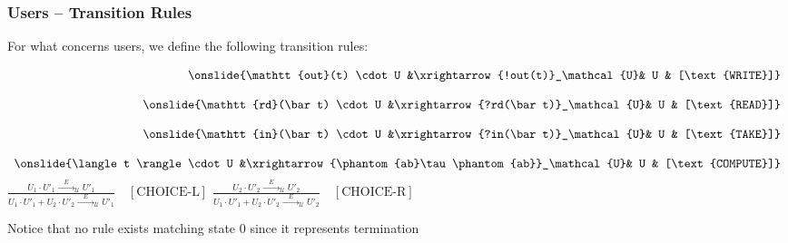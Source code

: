 \documentclass[presentation]{beamer}\mode<presentation>{\usetheme{AMSCesenaPurpleAndGold}}
\begin{document}
\begin{frame}
\frametitle{Users  -- Transition Rules}
    For what concerns \linda{} users, we define the following transition rules:
    
    \[\begin{array}{rclr}
        \onslide{\mathtt{out}(t) \cdot U &\xrightarrow{!out(t)}_\mathcal{U}& U & [\text{WRITE}]} \\
        \\
        \onslide{\mathtt{rd}(\bar t) \cdot U &\xrightarrow{?rd(\bar t)}_\mathcal{U}& U & [\text{READ}]} \\
        \\
        \onslide{\mathtt{in}(\bar t) \cdot U &\xrightarrow{?in(\bar t)}_\mathcal{U}& U & [\text{TAKE}]} \\
        \\
        \onslide{\langle t \rangle \cdot U &\xrightarrow{\phantom{ab}\tau\phantom{ab}}_\mathcal{U}& U & [\text{COMPUTE}]}
    \end{array}\]
    \onslide$
        \frac{U_1 \cdot U'_1 \xrightarrow{\phantom{ab}E\phantom{ab}}_\mathcal{U} U'_1}{U_1 \cdot U'_1 + U_2 \cdot U'_2 \xrightarrow{\phantom{ab}E\phantom{ab}}_\mathcal{U} U'_1} \quad [\text{CHOICE-L}]
    $ 
    \hfill
    \onslide$
        \frac{U_2 \cdot U'_2 \xrightarrow{\phantom{ab}E\phantom{ab}}_\mathcal{U} U'_2}{U_1 \cdot U'_1 + U_2 \cdot U'_2 \xrightarrow{\phantom{ab}E\phantom{ab}}_\mathcal{U} U'_2} \quad [\text{CHOICE-R}]
    $ 
    
    \vfill
    
    \begin{block}{}
        Notice that no rule exists matching state $0$ since it represents termination
    \end{block}
    
\end{frame}
\end{document}
